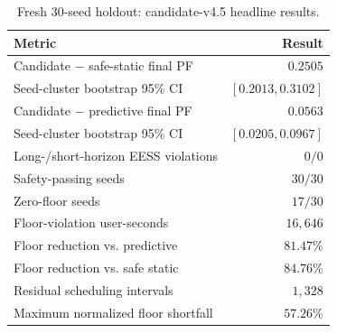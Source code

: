\begin{table}[t]
\caption{Fresh 30-seed holdout: candidate-v4.5 headline results.}
\label{tab:holdout-key}
\centering
\footnotesize
\setlength{\tabcolsep}{3.1pt}
\renewcommand{\arraystretch}{1.08}
\begin{tabular}{@{}lr@{}}
\toprule
Metric & Result\\
\midrule
Candidate $-$ safe-static final PF & $0.2505$\\
Seed-cluster bootstrap 95\% CI & $[0.2013,0.3102]$\\
Candidate $-$ predictive final PF & $0.0563$\\
Seed-cluster bootstrap 95\% CI & $[0.0205,0.0967]$\\
Long-/short-horizon EESS violations & $0/0$\\
Safety-passing seeds & $30/30$\\
Zero-floor seeds & $17/30$\\
Floor-violation user-seconds & $16{,}646$\\
Floor reduction vs. predictive & $81.47\%$\\
Floor reduction vs. safe static & $84.76\%$\\
Residual scheduling intervals & $1{,}328$\\
Maximum normalized floor shortfall & $57.26\%$\\
\bottomrule
\end{tabular}
\end{table}
